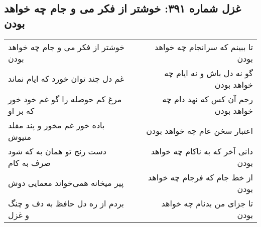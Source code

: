\begin{center}
\section*{غزل شماره ۳۹۱: خوشتر از فکر می و جام چه خواهد بودن}
\label{sec:sh391}
\begin{longtable}{l p{0.5cm} r}
خوشتر از فکر می و جام چه خواهد بودن
&&
تا ببینم که سرانجام چه خواهد بودن
\\
غم دل چند توان خورد که ایام نماند
&&
گو نه دل باش و نه ایام چه خواهد بودن
\\
مرغ کم حوصله را گو غم خود خور که بر او
&&
رحم آن کس که نهد دام چه خواهد بودن
\\
باده خور غم مخور و پند مقلد منیوش
&&
اعتبار سخن عام چه خواهد بودن
\\
دست رنج تو همان به که شود صرف به کام
&&
دانی آخر که به ناکام چه خواهد بودن
\\
پیر میخانه همی‌خواند معمایی دوش
&&
از خط جام که فرجام چه خواهد بودن
\\
بردم از ره دل حافظ به دف و چنگ و غزل
&&
تا جزای من بدنام چه خواهد بودن
\\
\end{longtable}
\end{center}
